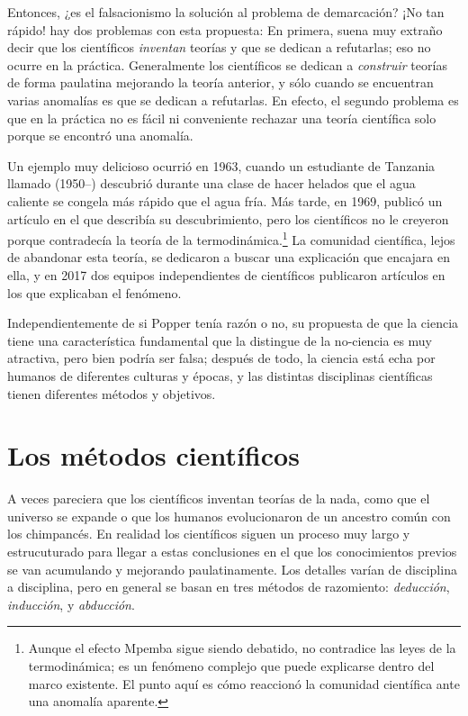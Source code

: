 Entonces, ¿es el falsacionismo la solución al problema de demarcación?
¡No tan rápido!
hay dos problemas con esta propuesta: En primera, suena muy extraño decir que los científicos \emph{inventan} teorías y que se dedican a refutarlas; eso no ocurre en la práctica.
Generalmente los científicos se dedican a \emph{construir} teorías de forma paulatina mejorando la teoría anterior, y sólo cuando se encuentran varias anomalías es que se dedican a refutarlas.
En efecto, el segundo problema es que en la práctica no es fácil ni conveniente rechazar una teoría científica solo porque se encontró una anomalía.

Un ejemplo muy delicioso ocurrió en 1963, cuando un estudiante de Tanzania llamado  (1950--) descubrió durante una clase de hacer helados que el agua caliente se congela más rápido que el agua fría.
Más tarde, en 1969, publicó un artículo en el que describía su descubrimiento\cite{Mpemba1979}, pero los científicos no le creyeron porque contradecía la teoría de la termodinámica.\footnote{Aunque el efecto Mpemba sigue siendo debatido, no contradice las leyes de la termodinámica; es un fenómeno complejo que puede explicarse dentro del marco existente. El punto aquí es cómo reaccionó la comunidad científica ante una anomalía aparente.}
La comunidad científica, lejos de abandonar esta teoría, se dedicaron a buscar una explicación que encajara en ella, y en 2017 dos equipos independientes de científicos publicaron artículos en los que explicaban el fenómeno.

Independientemente de si Popper tenía razón o no, su propuesta de que la ciencia tiene una característica fundamental que la distingue de la no-ciencia es muy atractiva, pero bien podría ser falsa; después de todo, la ciencia está echa por humanos de diferentes culturas y épocas, y las distintas disciplinas científicas tienen diferentes métodos y objetivos.

\section{Los métodos científicos}
\label{sec:losmetodoscientificos}

A veces pareciera que los científicos inventan teorías de la nada, como que el universo se expande o que los humanos evolucionaron de un ancestro común con los chimpancés.
En realidad los científicos siguen un proceso muy largo y estrucuturado para llegar a estas conclusiones en el que los conocimientos previos se van acumulando y mejorando paulatinamente.
Los detalles varían de disciplina a disciplina, pero en general se basan en tres métodos de razomiento: \emph{deducción}, \emph{inducción}, y \emph{abducción}.

